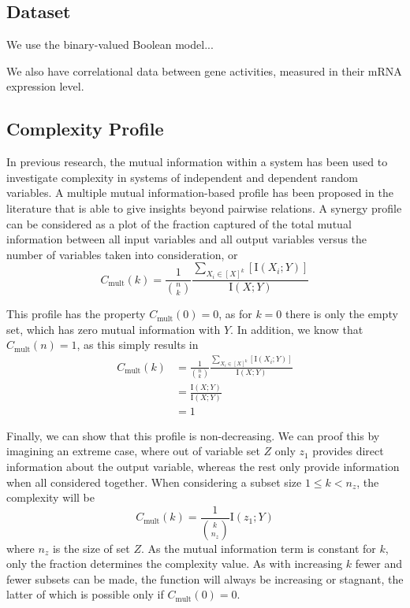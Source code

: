 \documentclass[../main.tex]{subfiles}
\begin{document}
\subsection{Dataset}

We use the binary-valued Boolean model...

We also have correlational data between gene activities, measured in their mRNA expression level.

\subsection{Complexity Profile}

In previous research, the mutual information within a system has been used to investigate complexity in systems of independent and dependent random variables.
A multiple mutual information-based profile has been proposed in the literature that is able to give insights beyond pairwise relations.
A synergy profile can be considered as a plot of the fraction captured of the total mutual information between all input variables and all output variables versus the number of variables taken into consideration, or
%
\begin{equation}
C_\mathrm{mult}(k) = \frac{1}{\binom{n}{k}}\frac{\sum_{X_i \in [X]^k} [\mathrm{I}(X_i;Y)]}{\mathrm{I}(X;Y)}
\end{equation}

This profile has the property $C_\mathrm{mult}(0) = 0$, as for $k = 0$ there is only the empty set, which has zero mutual information with $Y$.
In addition, we know that $C_\mathrm{mult}(n) = 1$, as this simply results in
%
\begin{align}
C_\mathrm{mult}(k) 
&= \frac{1}{\binom{n}{k}}\frac{\sum_{X_i \in [X]^k} [\mathrm{I}(X_i;Y)]}{\mathrm{I}(X;Y)} \\
&= \frac{\mathrm{I}(X;Y)}{\mathrm{I}(X;Y)} \\
&= 1
\end{align}

Finally, we can show that this profile is non-decreasing.
We can proof this by imagining an extreme case, where out of variable set $Z$ only $z_1$ provides direct information about the output variable, whereas the rest only provide information when all considered together.
When considering a subset size $1 \le k < n_z $, the complexity will be
%
\begin{equation}
C_\mathrm{mult}(k) = \frac{1}{\binom{k}{n_z}} \mathrm{I}(z_1;Y)
\end{equation}
%
where $n_z$ is the size of set $Z$.
As the mutual information term is constant for $k$, only the fraction determines the complexity value.
As with increasing $k$ fewer and fewer subsets can be made, the function will always be increasing or stagnant, the latter of which is possible only if $C_\mathrm{mult}(0) = 0$.
\end{document}
